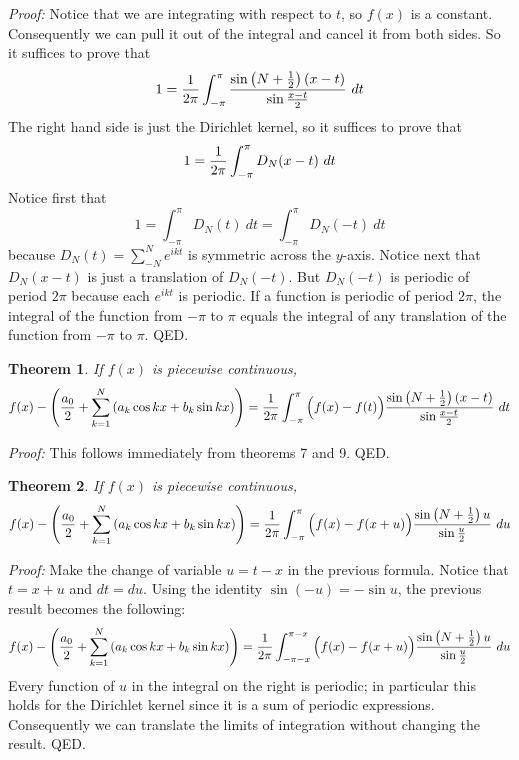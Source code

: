 \documentclass[11pt, oneside]{article}   	%
\newtheorem{theorem}{Theorem}
\begin{document}
{\em Proof:} Notice that we are integrating with respect to $t$, so $f(x)$ is a constant. Consequently we can pull it out of the integral and cancel it from both sides. So it suffices to prove that
\[1 = {1 \over {2 \pi}} \int_{- \pi}^\pi  {{\sin \left(N + {1 \over 2}\right)(x - t)} \over {\sin {{x - t} \over 2}}} \ dt\]
The right hand side is just the Dirichlet kernel, so it suffices to prove that
\[1 = {1 \over {2 \pi}} \int_{-\pi}^\pi D_N(x - t)\ dt\]
Notice first that 
\[1 = \int_{- \pi}^\pi D_N(t) \ dt = \int_{- \pi}^\pi D_N(-t) \ dt\]
because $D_N(t) = \sum_{-N}^N e^{ikt}$ is symmetric across the $y$-axis. Notice next that $D_N(x - t)$ is just a translation of $D_N(-t)$. But $D_N(-t)$ is periodic of period $2 \pi$ because each $e^{ikt}$ is periodic. If a function is periodic of period $2 \pi$, the integral of the function from $- \pi$ to $\pi$ equals the integral of any translation of the function from $-\pi$ to $\pi$. QED.

\begin{theorem} If $f(x)$ is piecewise continuous,
\[f(x) - \left({{a_0} \over 2} + \sum_{k = 1}^N \left( a_k \cos kx + b_k \sin kx \right)\right) =  {1 \over {2 \pi}} \int_{- \pi}^\pi \Big( f(x) - f(t)\Big) {{\sin \left(N + {1 \over 2}\right)(x - t)} \over {\sin {{x - t} \over 2}}} \ dt\]
\end{theorem}

{\em Proof:} This follows immediately from theorems 7 and 9. QED.

\begin{theorem} If $f(x)$ is piecewise continuous,
\[f(x) - \left({{a_0} \over 2} + \sum_{k = 1}^N \left( a_k \cos kx + b_k \sin kx \right)\right) =  {1 \over {2 \pi}} \int_{- \pi}^\pi  \Big( f(x) - f(x + u)\Big) {{\sin \left(N + {1 \over 2}\right)u} \over {\sin {{u \over 2}}}} \ du\]
\end{theorem}

{\em Proof:} Make the change of variable $u = t - x$ in the previous formula. Notice that $t = x + u$ and $dt = du$. Using the identity $\sin(-u) = - \sin u$, the previous result becomes the following:
\[f(x) - \left({{a_0} \over 2} + \sum_{k = 1}^N \left( a_k \cos kx + b_k \sin kx \right)\right) =  {1 \over {2 \pi}} \int_{- \pi - x}^{\pi- x} \Big( f(x) - f(x + u)\Big) {{\sin \left(N + {1 \over 2}\right)u} \over {\sin {{u \over 2}}}} \ du\]
Every function of $u$ in the integral on the right is periodic; in particular this holds for the Dirichlet kernel since it is a sum of periodic expressions. Consequently we can translate the limits of integration without changing the result. QED.
\end{document}
